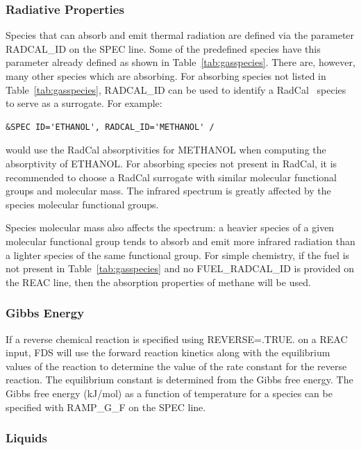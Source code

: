 \documentclass[11pt]{book}
\begin{document}
\subsubsection{Radiative Properties}
\label{info:radiative_spec_props}

Species that can absorb and emit thermal radiation are defined via the parameter {\ct RADCAL\_ID} on the {\ct SPEC} line.  Some of the predefined species have this parameter already defined as shown in Table~\ref{tab:gasspecies}.  There are, however, many other species which are absorbing.  For absorbing species not listed in Table~\ref{tab:gasspecies}, {\ct RADCAL\_ID} can be used to identify a RadCal~\cite{RadCal} species to serve as a surrogate. For example:
\begin{lstlisting}
&SPEC ID='ETHANOL', RADCAL_ID='METHANOL' /
\end{lstlisting}
would use the RadCal absorptivities for {\ct METHANOL} when computing the absorptivity of {\ct ETHANOL}. For absorbing species not present in RadCal, it is recommended to choose a RadCal surrogate with similar molecular functional groups and molecular mass. The infrared spectrum is greatly affected by the species molecular functional groups.

Species molecular mass also affects the spectrum: a heavier species of a given molecular functional group tends to absorb and emit more infrared radiation than a lighter species of the same functional group.  For simple chemistry, if the fuel is not present in Table~\ref{tab:gasspecies} and no {\ct FUEL\_RADCAL\_ID} is provided on the {\ct REAC} line, then the absorption properties of methane will be used.

\subsubsection{Gibbs Energy}

If a reverse chemical reaction is specified using {\ct REVERSE=.TRUE.} on a {\ct REAC} input, FDS will use the forward reaction kinetics along with the equilibrium values of the reaction to determine the value of the rate constant for the reverse reaction.  The equilibrium constant is determined from the Gibbs free energy.  The Gibbs free energy (kJ/mol) as a function of temperature for a species can be specified with {\ct RAMP\_G\_F} on the {\ct SPEC} line.

\subsubsection{Liquids}
\end{document}
